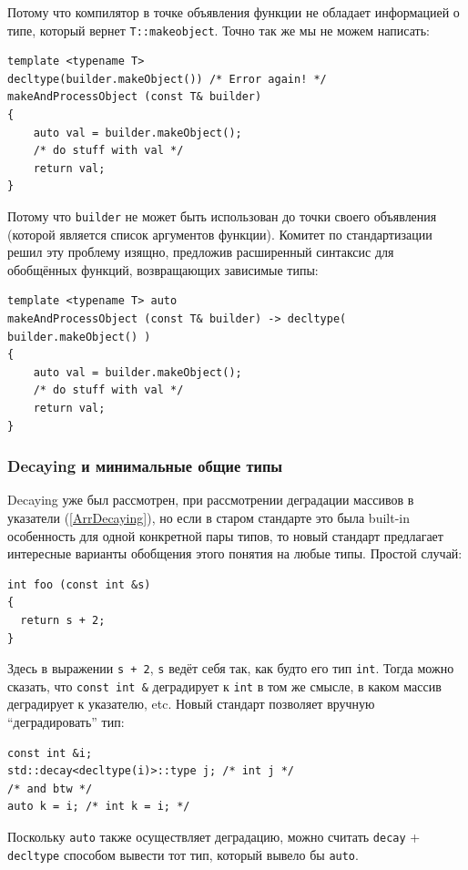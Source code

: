 \documentclass[a4paper,12pt,oneside]{article}
\begin{document}
Потому что компилятор в точке объявления функции не обладает информацией о типе, который вернет \lstinline!T::makeobject!. Точно так же мы не можем написать:

\begin{lstlisting}
template <typename T> 
decltype(builder.makeObject()) /* Error again! */
makeAndProcessObject (const T& builder)
{
    auto val = builder.makeObject();
    /* do stuff with val */
    return val;
}
\end{lstlisting}

Потому что \lstinline!builder! не может быть использован до точки своего объявления (которой является список аргументов функции). Комитет по стандартизации решил эту проблему изящно, предложив расширенный синтаксис для обобщённых функций, возвращающих зависимые типы:

\begin{lstlisting}
template <typename T> auto
makeAndProcessObject (const T& builder) -> decltype( builder.makeObject() )
{
    auto val = builder.makeObject();
    /* do stuff with val */
    return val;
}
\end{lstlisting}

\subsubsection{Decaying и минимальные общие типы}

Decaying уже был рассмотрен, при рассмотрении деградации массивов в указатели (\ref{ArrDecaying}), но если в старом стандарте это была built-in особенность для одной конкретной пары типов, то новый стандарт предлагает интересные варианты обобщения этого понятия на любые типы. Простой случай:

\begin{lstlisting}
int foo (const int &s) 
{ 
  return s + 2; 
}
\end{lstlisting}

Здесь в выражении \lstinline!s + 2!, \lstinline!s! ведёт себя так, как будто его тип \lstinline!int!. Тогда можно сказать, что \lstinline!const int &! деградирует к \lstinline!int! в том же смысле, в каком массив деградирует к указателю, etc. Новый стандарт позволяет вручную ``деградировать'' тип:

\begin{lstlisting}
const int &i;
std::decay<decltype(i)>::type j; /* int j */
/* and btw */
auto k = i; /* int k = i; */
\end{lstlisting}

Поскольку \lstinline!auto! также осуществляет деградацию, можно считать \lstinline!decay! + \lstinline!decltype! способом вывести тот тип, который вывело бы \lstinline!auto!.
\end{document}
